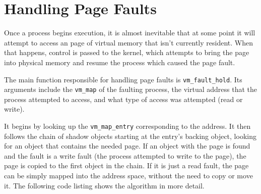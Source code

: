 \documentclass[shortabstract, english]{iithesis}
\begin{document}
\section{Handling Page Faults}

Once a process begins execution, it is almost inevitable that at some point it
will attempt to access an page of virtual memory that isn't currently resident.
When that happens, control is passed to the kernel, which attempts to bring the
page into physical memory and resume the process which caused the page fault.

The main function responsible for handling page faults is
\texttt{vm_fault_hold}. Its arguments include the \texttt{vm_map}
of the faulting process, the virtual address that the process attempted to
access, and what type of access was attempted (read or write).

It begins by looking up the \texttt{vm_map_entry} corresponding to the
address. It then follows the chain of shadow objects starting at the entry's
backing object, looking for an object that contains the needed page. If an
object with the page is found and the fault is a write fault (the process
attempted to write to the page), the page is copied to the first object in the
chain. If it is just a read fault, the page can be simply mapped into the
address space, without the need to copy or move it. The following code listing
shows the algorithm in more detail.
\end{document}
